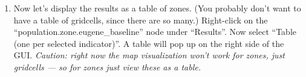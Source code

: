 \documentclass{howto}
\begin{document}
\begin{enumerate}
\item Now let's display the results as a table of zones.  (You probably
  don't want to have a table of gridcells, since there are so many.)
  Right-click on the ``population.zone.eugene_baseline'' node under
  ``Results''.  Now select ``Table (one per selected indicator)''.  A table
  will pop up on the right side of the GUI.  \emph{Caution: right now the
  map visualization won't work for zones, just gridcells --- so for zones
  just view these as a table.}

\end{enumerate}








\end{document}
